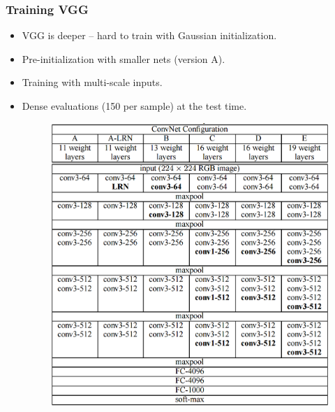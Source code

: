 \documentclass[9pt]{beamer}
\begin{document}
\begin{frame}
	\frametitle{Training VGG}
		\begin{itemize}
			\item VGG is deeper -- hard to train with Gaussian initialization.
			\item Pre-initialization with smaller nets (version A).
			\item Training with multi-scale inputs.
			\item Dense evaluations (150 per sample) at the test time.
			\begin{figure}
				\includegraphics[scale=0.14]{./figures/edit/vgg_all.png}
			\end{figure}
		\end{itemize}
		\pause	

\end{frame}
\end{document}
